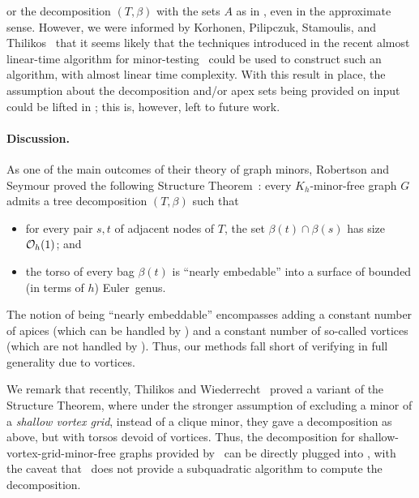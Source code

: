 or the decomposition $(T,\beta)$ with the sets $A$ as in , even in the approximate sense. However, we were informed by Korhonen, Pilipczuk, Stamoulis, and Thilikos~\cite{KorhonenPST24priv} that it seems likely that the techniques introduced in the recent almost linear-time algorithm for minor-testing~\cite{KorhonenPS24} could be used to construct such an algorithm, with almost linear time complexity. With this result in place, the assumption about the decomposition and/or apex sets being provided on input could be lifted in ; this is, however, left to future work.


\paragraph{Discussion.}
As one of the main outcomes of their theory of graph minors, Robertson and Seymour proved the following Structure Theorem~\cite{RobertsonS03a}: every $K_h$-minor-free graph $G$
admits a tree decomposition $(T,\beta)$ such that
\begin{itemize}[nosep]
 \item for every pair $s,t$ of adjacent nodes of $T$, the set $\beta(t) \cap \beta(s)$ has size $\mathcal{O}_h(1)$; and
 \item the torso of every bag $\beta(t)$ is ``nearly embedable'' into a surface of bounded (in terms of $h$) Euler~genus.
\end{itemize}
The notion of being ``nearly embeddable'' encompasses adding a constant number of apices (which can be handled by ) and a constant number of so-called
vortices (which are not handled by ). Thus, our methods fall short of verifying   in full generality due to vortices.

We remark that recently, Thilikos and Wiederrecht~\cite{ThilikosW22} proved a variant of the Structure Theorem, where under the stronger assumption of excluding a minor of a {\em{shallow vortex grid}}, instead of a clique minor, they gave a decomposition as above, but with torsos devoid of vortices. Thus, the decomposition for shallow-vortex-grid-minor-free graphs provided by~\cite{ThilikosW22} can be directly plugged into , with the caveat that~\cite{ThilikosW22} does not provide a subquadratic algorithm to compute the decomposition.

